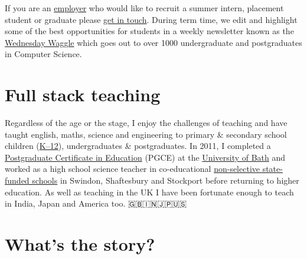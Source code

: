 \documentclass[
  12pt,
]{book}
\begin{document}
If you are an \href{http://www.cs.man.ac.uk/~hulld/employers.html}{employer} who would like to recruit a summer intern, placement student or graduate please \href{http://www.cs.man.ac.uk/~hulld/contact.html}{get in touch}. During term time, we edit and highlight some of the best opportunities for students in a weekly newsletter known as the \href{https://waggle.cs.manchester.ac.uk/waggle/about}{Wednesday Waggle} which goes out to over 1000 undergraduate and postgraduates in Computer Science. 🐝

\hypertarget{full-stack-teaching}{%
\section*{Full stack teaching}\label{full-stack-teaching}}

Regardless of the age or the stage, I enjoy the challenges of teaching and have taught english, maths, science and engineering to primary \& secondary school children (\href{https://en.wikipedia.org/wiki/K\%E2\%80\%9312}{K--12}), undergraduates \& postgraduates. In 2011, I completed a \href{https://en.wikipedia.org/wiki/Postgraduate_Certificate_in_Education}{Postgraduate Certificate in Education} (PGCE) at the \href{https://www.bath.ac.uk/}{University of Bath} and worked as a high school science teacher in co-educational \href{https://en.wikipedia.org/wiki/State-funded_schools_(England)}{non-selective state-funded schools} in Swindon, Shaftesbury and Stockport before returning to higher education. As well as teaching in the UK I have been fortunate enough to teach in India, Japan and America too. 🇬🇧🇮🇳🇯🇵🇺🇸

\hypertarget{whats-the-story}{%
\section*{What's the story?}\label{whats-the-story}}
\end{document}
